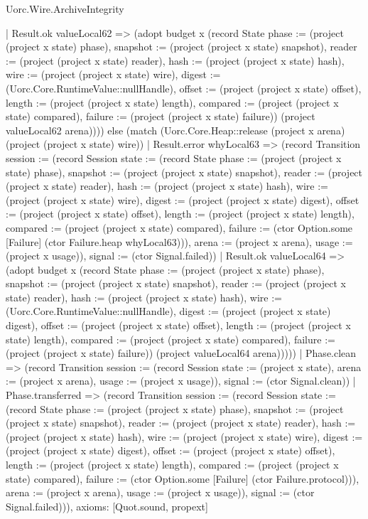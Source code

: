 \begin{lexlean}{Uorc.Wire.ArchiveIntegrity}
\begin{semanticmodule}
{      | Result.ok valueLocal62 => (adopt budget x (record State {phase := (project (project x state) phase), snapshot := (project (project x state) snapshot), reader := (project (project x state) reader), hash := (project (project x state) hash), wire := (project (project x state) wire), digest := (Uorc.Core.RuntimeValue::nullHandle), offset := (project (project x state) offset), length := (project (project x state) length), compared := (project (project x state) compared), failure := (project (project x state) failure)}) (project valueLocal62 arena)))) else (match (Uorc.Core.Heap::release (project x arena) (project (project x state) wire))
      | Result.error whyLocal63 => (record Transition {session := (record Session {state := (record State {phase := (project (project x state) phase), snapshot := (project (project x state) snapshot), reader := (project (project x state) reader), hash := (project (project x state) hash), wire := (project (project x state) wire), digest := (project (project x state) digest), offset := (project (project x state) offset), length := (project (project x state) length), compared := (project (project x state) compared), failure := (ctor Option.some [Failure] (ctor Failure.heap whyLocal63))}), arena := (project x arena), usage := (project x usage)}), signal := (ctor Signal.failed)})
      | Result.ok valueLocal64 => (adopt budget x (record State {phase := (project (project x state) phase), snapshot := (project (project x state) snapshot), reader := (project (project x state) reader), hash := (project (project x state) hash), wire := (Uorc.Core.RuntimeValue::nullHandle), digest := (project (project x state) digest), offset := (project (project x state) offset), length := (project (project x state) length), compared := (project (project x state) compared), failure := (project (project x state) failure)}) (project valueLocal64 arena)))))
    | Phase.clean => (record Transition {session := (record Session {state := (project x state), arena := (project x arena), usage := (project x usage)}), signal := (ctor Signal.clean)})
    | Phase.transferred => (record Transition {session := (record Session {state := (record State {phase := (project (project x state) phase), snapshot := (project (project x state) snapshot), reader := (project (project x state) reader), hash := (project (project x state) hash), wire := (project (project x state) wire), digest := (project (project x state) digest), offset := (project (project x state) offset), length := (project (project x state) length), compared := (project (project x state) compared), failure := (ctor Option.some [Failure] (ctor Failure.protocol))}), arena := (project x arena), usage := (project x usage)}), signal := (ctor Signal.failed)})),
  axioms: [Quot.sound, propext]
}


\end{semanticmodule}
\end{lexlean}

